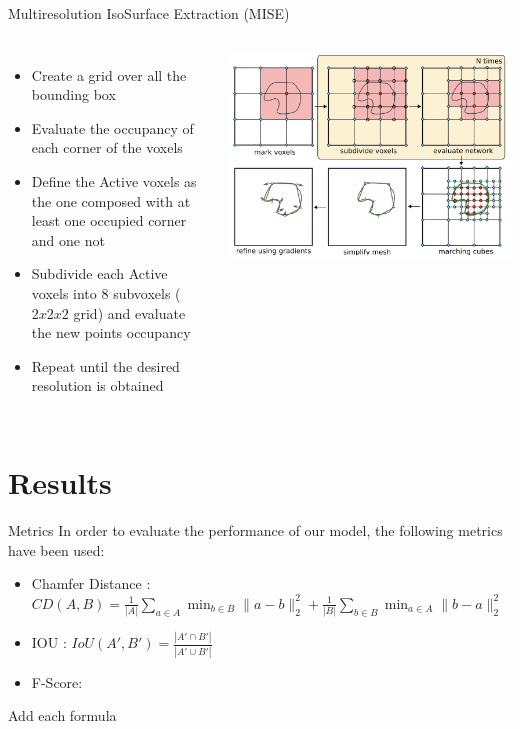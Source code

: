 \documentclass{beamer}
\begin{document}
\begin{frame}{Multiresolution IsoSurface Extraction (MISE)}
    \begin{columns}[T]
        \begin{itemize}
            \item Create a grid over all the bounding box 
            \item Evaluate the occupancy of each corner of the voxels
            \item Define the Active voxels as the one composed with at least one occupied corner and one not 
            \item Subdivide each Active voxels into 8 subvoxels ($2x2x2$ grid) and evaluate the new points occupancy
            \item Repeat until the desired resolution is obtained
        \end{itemize}
        \includegraphics[width=\linewidth]{../Media/structure/mise.png}
    \end{columns}
  \end{frame}

\section{Results}

\begin{frame}{Metrics}
In order to evaluate the performance of our model, the following metrics have been used:
\begin{itemize}
\item Chamfer Distance : \\ 
$
CD(A, B) = \frac{1}{|A|} \sum_{a \in A} \min_{b \in B} \|a - b\|_2^2 + \frac{1}{|B|} \sum_{b \in B} \min_{a \in A} \|b - a\|_2^2
$
\item IOU : 
$ IoU(A', B') = \frac{|A' \cap B'|}{|A' \cup B'|}$
\item F-Score:
\end{itemize}
Add each formula
\end{frame}
\end{document}
